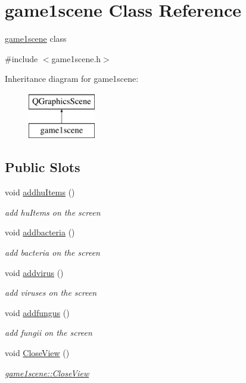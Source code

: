 \hypertarget{classgame1scene}{\section{game1scene Class Reference}
\label{classgame1scene}
}


\hyperlink{classgame1scene}{game1scene} class  




{\ttfamily \#include $<$game1scene.\-h$>$}

Inheritance diagram for game1scene\-:\begin{figure}[H]
\begin{center}
\leavevmode
\includegraphics[height=2.000000cm]{classgame1scene}
\end{center}
\end{figure}
\subsection*{Public Slots}
\begin{DoxyCompactItemize}
\item 
void \hyperlink{classgame1scene_a8df6dd08b6c8af1846612a967ad44f4a}{addhu\-Items} ()
\begin{DoxyCompactList}\small\item\em add hu\-Items on the screen \end{DoxyCompactList}\item 
void \hyperlink{classgame1scene_ae3d9c421c6c328769c83933533017f2d}{addbacteria} ()
\begin{DoxyCompactList}\small\item\em add bacteria on the screen \end{DoxyCompactList}\item 
void \hyperlink{classgame1scene_a2488f3cbaa02776cbb0963af8c07b97f}{addvirus} ()
\begin{DoxyCompactList}\small\item\em add viruses on the screen \end{DoxyCompactList}\item 
void \hyperlink{classgame1scene_aa4a059bf4feb9b5858b6f486dbbb1ff7}{addfungus} ()
\begin{DoxyCompactList}\small\item\em add fungii on the screen \end{DoxyCompactList}\item 
void \hyperlink{classgame1scene_add7e3b72a6fe43d4ace0059ef2c29efc}{Close\-View} ()
\begin{DoxyCompactList}\small\item\em \hyperlink{classgame1scene_add7e3b72a6fe43d4ace0059ef2c29efc}{game1scene\-::\-Close\-View} \end{DoxyCompactList}\end{DoxyCompactItemize}
